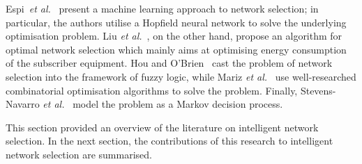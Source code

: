Espi~\emph{et al.}~\cite{Espi10} present a machine learning approach to network selection; in particular, the authors utilise a Hopfield neural network to solve the underlying optimisation problem. Liu \emph{et al.}~\cite{Liu2009}, on the other hand, propose an algorithm for optimal network selection which mainly aims at optimising energy consumption of the subscriber equipment. Hou and O'Brien~\cite{Hou2006} cast the problem of network selection into the framework of fuzzy logic, while Mariz \emph{et al.}~\cite{Mariz2006} use well-researched combinatorial optimisation algorithms to solve the problem. Finally, Stevens-Navarro \emph{et al.}~\cite{StevensNavarro2008} model the problem as a Markov decision process.

This section provided an overview of the literature on intelligent network selection. In the next section, the contributions of this research to intelligent network selection are summarised.

